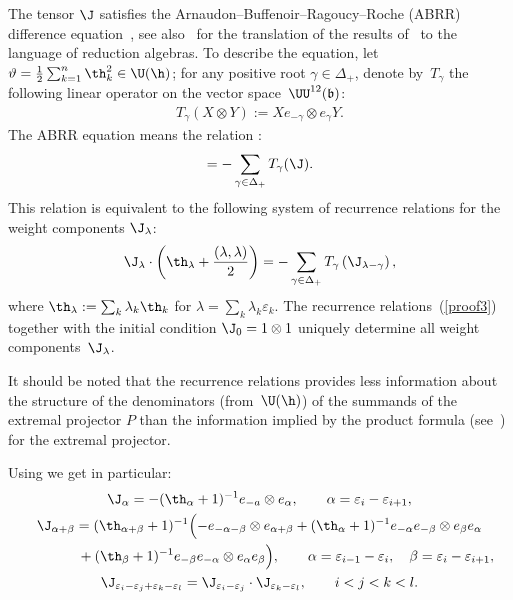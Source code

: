 \documentclass[pdftex]{sigma}
\def\a{\alpha}\def\Ar{{\rm A}}\def\Ab{\bar{\rm A}}\def\b{\beta}\def\bb{\mathfrak{b}}
\def\UUb{\UU^{12}(\bb)}\def\V{\mathrm {V}}\def\ve{\varepsilon}\def\Z{\mathrm{Z}}\def\SZ{\mathrm{SZ}}
\numberwithin{equation}{section}
\begin{document}
The tensor $\J$ satisf\/ies the Arnaudon--Buf\/fenoir--Ragoucy--Roche (ABRR) dif\/ference equation~\cite{ABRR}, see also~\cite{K} for the translation of the results of~\cite{ABRR} to the language
of reduction algebras. To describe the equation, let  $\vartheta=\frac{1}{2}
\sum_{k=1}^n\th_k^2\in \U(\h)$;
for any positive root $\gamma\in\Delta_+$, denote by~$T_\gamma$ the following linear operator on the vector space~$\UUb$:
\begin{gather*}T_{\gamma}(X\otimes Y):=X e_{-\gamma}\otimes e_{\gamma}Y  .\end{gather*}
The ABRR equation means the relation \cite{ABRR,K}:
\begin{gather*}%
[1\otimes \vartheta, \J]=-\sum_{\gamma\in\Delta_+}T_{\gamma}(\J)
 .
\end{gather*}
This relation is equivalent to the following system of recurrence relations for the weight components
$\J_\lambda$:
\begin{gather} \label{proof3}
\J_\lambda\cdot\left(\th_\lambda+\frac{(\lambda,\lambda)}{2}\right)=
-\sum_{\gamma\in\Delta_+}T_\gamma\left(\J_{\lambda-\gamma}\right)  ,
\end{gather}
where $\th_\lambda :=\sum_k\lambda_k\th_k$ for $\lambda=\sum_k\lambda_k\ve_k$. The recurrence
relations~(\ref{proof3})  together with the initial condition $\J_0=1\otimes 1$
uniquely determine all weight components~$\J_\lambda$.


It should be noted that the recurrence relations  provides less information about the structure of the denominators (from~$\U (\h )$)
of the summands of the extremal projector $P$ than the information implied
 by the product formula (see~\cite{AST}) for the extremal projector.


Using  we get in particular:
\begin{gather} \label{proof3a}
\J_{\a}  = -(\th_{\a}+1)^{-1}e_{-a}\otimes e_{\a} ,
\qquad \a=\ve_i-\ve_{i+1} ,
\\ \notag
 \J_{\a+\beta}  =  (\th_{\a+\b}+1)^{-1}\Bigl(-e_{-\a-\b}\otimes e_{\a+\b}+
(\th_{\a}+1)^{-1} e_{-\a}e_{-\b}\otimes e_{\b}e_{\a}\\
\phantom{\J_{\a+\beta}  =}{}  +(\th_{\b}+1)^{-1} e_{-\b}e_{-\a}\otimes e_{\a}e_{\b}\Bigr)
  ,\qquad \a=\ve_{i-1}-\ve_{i}  ,\quad \b=\ve_{i}-\ve_{i+1}  ,\label{proof3b}
\\
  \label{proof3c}\J_{\ve_i-\ve_{j}+\ve_k-\ve_{l}}= \J_{\ve_i-\ve_{j}}\cdot
\J_{\ve_k-\ve_{l}}  ,\qquad  i<j<k<l  .
\end{gather}
\end{document}
